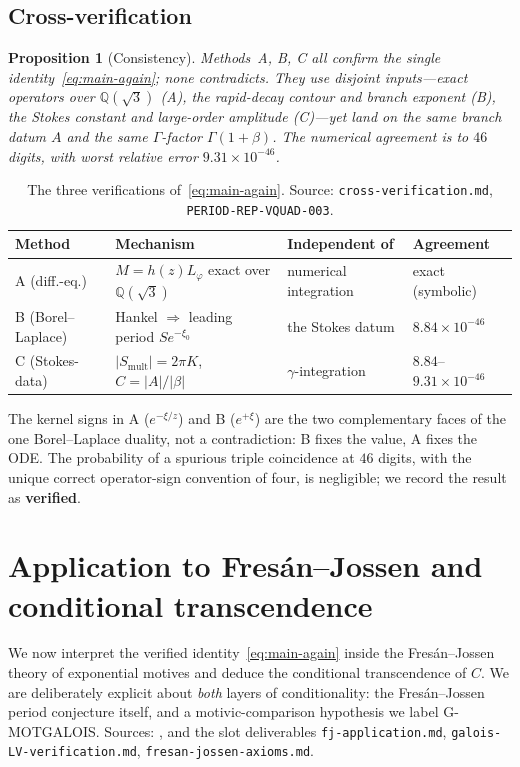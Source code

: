 \documentclass[11pt,reqno]{amsart}
\renewcommand{\_}{\vquadorigunderscore\allowbreak}
\theoremstyle{plain}
\newtheorem{proposition}[theorem]{Proposition}
\theoremstyle{definition}
\newcommand{\Lphi}{L_{\varphi}}
\newcommand{\Qsqrt}{\mathbb{Q}(\sqrt3)}
\newcommand{\xizero}{\xi_0}
\providecommand{\C}{}\renewcommand{\C}{C}
\begin{document}
\subsection{Cross-verification}\label{sub:cross}
\begin{proposition}[Consistency]\label{prop:cross}
Methods~A, B, C all confirm the single identity~\eqref{eq:main-again}; none contradicts. They use
disjoint inputs---exact operators over $\Qsqrt$ (A), the rapid-decay contour and branch exponent
(B), the Stokes constant and large-order amplitude (C)---yet land on the same branch datum $A$ and
the same $\Gamma$-factor $\Gamma(1+\beta)$. The numerical agreement is to $46$ digits, with worst
relative error $9.31\times10^{-46}$.
\end{proposition}

\begin{table}[h]
\centering
{\footnotesize
\begin{tabular}{@{}llll@{}}
\hline
Method & Mechanism & Independent of & Agreement \\
\hline
A (diff.-eq.) & $M=h(z)\Lphi$ exact over $\Qsqrt$ & numerical integration & exact (symbolic) \\
B (Borel--Laplace) & Hankel $\Rightarrow$ leading period $S e^{-\xizero}$ & the Stokes datum & $8.84\times10^{-46}$ \\
C (Stokes-data) & $\lvert S_{\mathrm{mult}}\rvert=2\pi K$, $\C=\lvert A\rvert/\lvert\beta\rvert$ & $\gamma$-integration & $8.84$--$9.31\times10^{-46}$ \\
\hline
\end{tabular}}
\caption{The three verifications of~\eqref{eq:main-again}. Source:
\texttt{cross-verification.md}, \texttt{PERIOD-REP-VQUAD-003}.}
\label{tab:methods}
\end{table}

The kernel signs in A ($e^{-\xi/z}$) and B ($e^{+\xi}$) are the two complementary faces of the one
Borel--Laplace duality, not a contradiction: B fixes the value, A fixes the ODE. The probability of
a spurious triple coincidence at $46$ digits, with the unique correct operator-sign convention of
four, is negligible; we record the result as \textbf{verified}.

\section{Application to Fres\'an--Jossen and conditional transcendence}\label{sec:fj}

We now interpret the verified identity~\eqref{eq:main-again} inside the Fres\'an--Jossen theory of
exponential motives and deduce the conditional transcendence of $\C$. We are deliberately explicit
about \emph{both} layers of conditionality: the Fres\'an--Jossen period conjecture itself, and a
motivic-comparison hypothesis we label G-MOTGALOIS. Sources: \cite{FJ}, and the slot deliverables
\texttt{fj-application.md}, \texttt{galois-LV-verification.md}, \texttt{fresan-jossen-axioms.md}.
\end{document}
